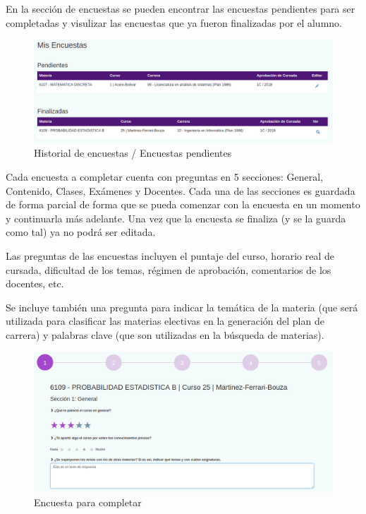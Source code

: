 \documentclass[a4paper]{article}
\begin{document}
En la sección de encuestas se pueden encontrar las encuestas pendientes para ser completadas y visulizar las encuestas que ya fueron finalizadas por el alumno.

\begin{figure}[H]
\centering
\includegraphics[scale=0.3]{Imagenes/historial_de_encuestas.png}\par
\caption{Historial de encuestas / Encuestas pendientes}
\end{figure}

Cada encuesta a completar cuenta con preguntas en 5 secciones: General, Contenido, Clases, Exámenes y Docentes. Cada una de las secciones es guardada de forma parcial de forma que se pueda comenzar con la encuesta en un momento y continuarla más adelante. Una vez que la encuesta se finaliza (y se la guarda como tal) ya no podrá ser editada.

Las preguntas de las encuestas incluyen el puntaje del curso, horario real de cursada, dificultad de los temas, régimen de aprobación, comentarios de los docentes, etc.

Se incluye también una pregunta para indicar la temática de la materia (que será utilizada para clasificar las materias electivas en la generación del plan de carrera) y palabras clave (que son utilizadas en la búsqueda de materias).

\begin{figure}[H]
\centering
\includegraphics[scale=0.3]{Imagenes/completar_encuesta.png}\par
\caption{Encuesta para completar}
\end{figure}
\end{document}
